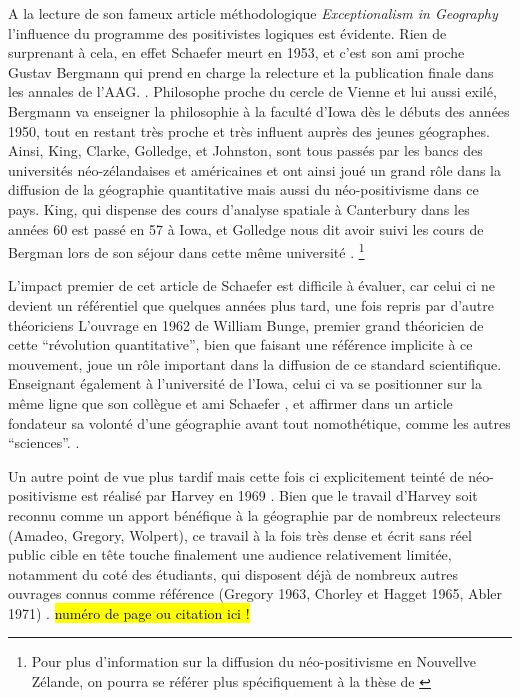 A la lecture de son fameux article méthodologique \textit{Exceptionalism in Geography} l'influence du programme des positivistes logiques est évidente. Rien de surprenant à cela, en effet Schaefer meurt en 1953, et c'est son ami proche Gustav Bergmann qui prend en charge la relecture et la publication finale dans les annales de l'AAG. \autocite[32]{Gregory1978}. Philosophe proche du cercle de Vienne et lui aussi exilé, Bergmann va enseigner la philosophie à la faculté d'Iowa dès le débuts des années 1950, tout en restant très proche et très influent auprès des jeunes géographes.\autocite[192]{Buttimer1983} Ainsi, King, Clarke, Golledge, et Johnston, sont tous passés par les bancs des universités néo-zélandaises et américaines et ont ainsi joué un grand rôle dans la diffusion de la géographie quantitative mais aussi du néo-positivisme dans ce pays. King, qui dispense des cours d'analyse spatiale à Canterbury dans les années 60 est passé en 57 à Iowa, et Golledge nous dit avoir suivi les cours de Bergman lors de son séjour dans cette même université \autocite[95-96]{Bailly2000}. \footnote{Pour plus d'information sur la diffusion du néo-positivisme en Nouvellve Zélande, on pourra se référer plus spécifiquement à la thèse de \textcite{Hammond1992}}

L'impact premier de cet article de Schaefer est difficile à évaluer, car celui ci ne devient un référentiel que quelques années plus tard, une fois repris par d'autre théoriciens \autocite[32]{Gregory1978} L'ouvrage en 1962 de William Bunge, premier grand théoricien de cette \enquote{révolution quantitative}, bien que faisant une référence implicite à ce mouvement, joue un rôle important dans la diffusion de ce standard scientifique. Enseignant également à l'université de l'Iowa, celui ci va se positionner sur la même ligne que son collègue et ami Schaefer \autocite{Goodchild2001}, et affirmer dans un article fondateur \autocite{Bunge1962} sa volonté d'une géographie avant tout nomothétique, comme les autres \enquote{sciences}. \autocite{Bunge1979} \autocite{Claval2003} \autocite[429-430]{Gregory2009}.

Un autre point de vue plus tardif mais cette fois ci explicitement teinté de néo-positivisme est réalisé par Harvey en 1969 \autocite{Harvey1969}. Bien que le travail d'Harvey soit reconnu comme un apport bénéfique à la géographie par de nombreux relecteurs (Amadeo, Gregory, Wolpert), ce travail à la fois très dense et écrit sans réel public cible en tête touche finalement une audience relativement limitée, notamment du coté des étudiants, qui disposent déjà de nombreux autres ouvrages connus comme référence (Gregory 1963, Chorley et Hagget 1965, Abler 1971) \autocite{Johnston2008}. \hl{numéro de page ou citation ici !}

